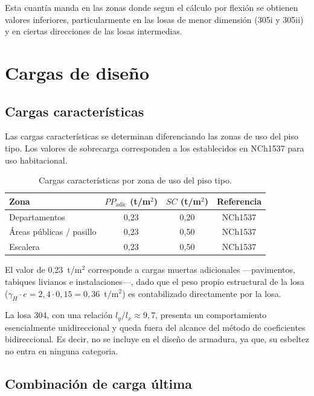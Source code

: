 Esta cuantía manda en las zonas donde segun el cálculo por flexión se obtienen valores inferiores, particularmente en las losas de menor dimensión (305i y 305ii) y en ciertas direcciones de las losas intermedias.
 
\section{Cargas de diseño}
\label{sec:cargas}
 
\subsection{Cargas características}
 
Las cargas características se determinan diferenciando las zonas de uso del piso tipo. Los valores de sobrecarga corresponden a los establecidos en NCh1537 para uso habitacional.
 
\begin{table}[h!]
\centering
\caption{Cargas características por zona de uso del piso tipo.}
\label{tab:cargas}
\begin{tabular}{lccc}
\toprule
Zona & $PP_{\text{adic}}$ (t/m$^2$) & $SC$ (t/m$^2$) & Referencia \\
\midrule
Departamentos            & 0{,}23 & 0{,}20 & NCh1537 \\
Áreas públicas / pasillo & 0{,}23 & 0{,}50 & NCh1537 \\
Escalera                 & 0{,}23 & 0{,}50 & NCh1537 \\
\bottomrule
\end{tabular}
\end{table}
 
El valor de 0{,}23~t/m$^2$ corresponde a cargas muertas adicionales —pavimentos, tabiques livianos e instalaciones—, dado que el peso propio estructural de la losa ($\gamma_H \cdot e = 2{,}4 \cdot 0{,}15 = 0{,}36$~t/m$^2$) es contabilizado directamente por la losa.
 
La losa 304, con una relación $l_y/l_x \approx 9{,}7$, presenta un comportamiento esencialmente unidireccional y queda fuera del alcance del método de coeficientes bidireccional. Es decir, no se incluye en el diseño de armadura, ya que, su esbeltez no entra en ninguna categoria.
 
\subsection{Combinación de carga última}
 
